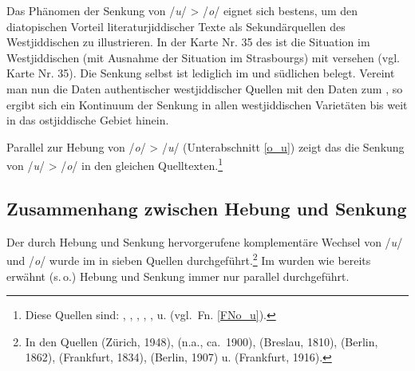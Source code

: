 Das Phänomen der Senkung von /\textit{u}/ > /\textit{o}/ eignet sich bestens, um den diatopischen Vorteil literaturjiddischer Texte als Sekundärquellen des Westjiddischen zu illustrieren. In der Karte Nr. 35 des  ist die Situation im Westjiddischen (mit Ausnahme der Situation im \hai{{\SWJ}} Strasbourgs) mit  versehen (vgl.\,  Karte Nr. 35). Die Senkung selbst ist lediglich im \hai{{\ZOJ}} und südlichen  belegt. Vereint man nun die Daten authentischer westjiddischer Quellen %
mit den Daten zum , so ergibt sich ein  Kontinuum der Senkung in allen westjiddischen Varietäten bis weit in das ostjiddische Gebiet hinein.\label{ProtoLCAAJOEWY2}%
 


 
 
 Parallel zur Hebung von /\textit{o}/ > /\textit{u}/ (Unterabschnitt \ref{o_u}) zeigt das  die Senkung von /\textit{u}/ > /\textit{o}/ in den gleichen Quelltexten.\footnote{Diese Quellen sind: , , , , ,  u.  (vgl.\, Fn. \ref{FNo_u}).} 
 
 
  \subsection{Zusammenhang zwischen Hebung und Senkung} \label{ou_uo}

Der durch Hebung und Senkung hervorgerufene komplementäre Wechsel von /\textit{u}/ und /\textit{o}/ wurde im  in sieben Quellen durchgeführt.\footnote{In den Quellen  (Zürich, 1948),  (n.a., ca.\, 1900),  (Breslau, 1810),  (Berlin, 1862),  (Frankfurt, 1834),  (Berlin, 1907) u.  (Frankfurt, 1916).} Im  wurden wie bereits erwähnt (s.\,o.) Hebung und Senkung immer nur parallel durchgeführt. 

